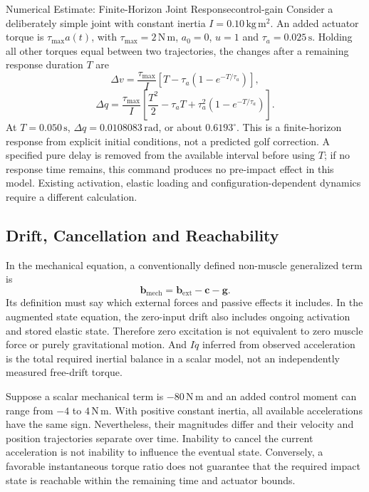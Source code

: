 \begin{example}{Numerical Estimate: Finite-Horizon Joint Response}{control-gain}
Consider a deliberately simple joint with constant inertia $I=0.10\,\mathrm{kg\,m^2}$. An added actuator torque is $\tau_{\max}a(t)$, with $\tau_{\max}=2\,\mathrm{N\,m}$, $a_0=0$, $u=1$ and $\tau_a=0.025\,\mathrm{s}$. Holding all other torques equal between two trajectories, the changes after a remaining response duration $T$ are
\[
\Delta v=\frac{\tau_{\max}}{I}\left[T-\tau_a(1-e^{-T/\tau_a})\right],
\]
\[
\Delta q=\frac{\tau_{\max}}{I}
\left[\frac{T^2}{2}-\tau_aT+\tau_a^2(1-e^{-T/\tau_a})\right].
\]
At $T=0.050\,\mathrm{s}$, $\Delta q=0.0108083\,\mathrm{rad}$, or about $0.6193^\circ$. This is a finite-horizon response from explicit initial conditions, not a predicted golf correction. A specified pure delay is removed from the available interval before using $T$; if no response time remains, this command produces no pre-impact effect in this model. Existing activation, elastic loading and configuration-dependent dynamics require a different calculation.
\end{example}

\subsection{Drift, Cancellation and Reachability}

In the mechanical equation, a conventionally defined non-muscle generalized term is
\begin{equation}
\boldsymbol b_{\mathrm{mech}}=
\boldsymbol b_{\mathrm{ext}}-\boldsymbol c-\boldsymbol g.
\label{eq:drift-torque}
\end{equation}
Its definition must say which external forces and passive effects it includes. In the augmented state equation, the zero-input drift also includes ongoing activation and stored elastic state. Therefore zero excitation is not equivalent to zero muscle force or purely gravitational motion. And $I\ddot q$ inferred from observed acceleration is the total required inertial balance in a scalar model, not an independently measured free-drift torque.

Suppose a scalar mechanical term is $-80\,\mathrm{N\,m}$ and an added control moment can range from $-4$ to $4\,\mathrm{N\,m}$. With positive constant inertia, all available accelerations have the same sign. Nevertheless, their magnitudes differ and their velocity and position trajectories separate over time. Inability to cancel the current acceleration is not inability to influence the eventual state. Conversely, a favorable instantaneous torque ratio does not guarantee that the required impact state is reachable within the remaining time and actuator bounds.


